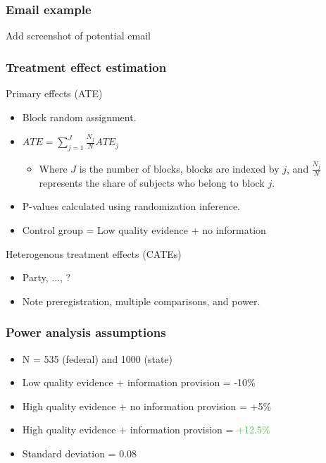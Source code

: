 \documentclass[usenames,dvipsnames]{beamer}
\begin{document}

\begin{frame}
\frametitle{Email example}

Add screenshot of potential email

\end{frame}




\begin{frame}
\frametitle{Treatment effect estimation}

Primary effects (ATE)
\begin{itemize}
\item Block random assignment.
\item $ATE = \sum_{j = 1}^{J} \frac{N_j}{N}ATE_j$
\begin{itemize}
\item Where $J$ is the number of blocks, blocks are indexed by $j$, and $\frac{N_j}{N}$ represents the share of subjects who belong to block $j$. 
\end{itemize}
\item P-values calculated using randomization inference.
\item Control group = Low quality evidence + no information
\vspace{0.5cm}
\end{itemize}
Heterogenous treatment effects (CATEs)
\begin{itemize}
\item Party, ..., ?
\item Note preregistration, multiple comparisons, and power.
\end{itemize}

\end{frame}


\begin{frame}
\frametitle{Power analysis assumptions}

\begin{itemize}
\item N = 535 (federal) and 1000 (state)
\vspace{0.5cm}
\item Low quality evidence + information provision = \textcolor{BrickRed}{-10\%}
\item High quality evidence + no information provision = \textcolor{Emerald}{+5\%}
\item High quality evidence + information provision = \textcolor{LimeGreen}{+12.5\%}
\vspace{0.5cm}
\item Standard deviation = 0.08
\end{itemize}

\end{frame}
\end{document}
